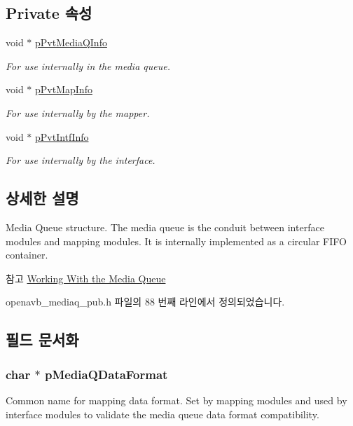 \subsection*{Private 속성}
\begin{DoxyCompactItemize}
\item 
void $\ast$ \hyperlink{structmedia__q__t_acb2a0999918038ea5c47311434ce7354}{p\+Pvt\+Media\+Q\+Info}
\begin{DoxyCompactList}\small\item\em For use internally in the media queue. \end{DoxyCompactList}\item 
void $\ast$ \hyperlink{structmedia__q__t_aee939b53d02a9217a5307ada087f3c50}{p\+Pvt\+Map\+Info}
\begin{DoxyCompactList}\small\item\em For use internally by the mapper. \end{DoxyCompactList}\item 
void $\ast$ \hyperlink{structmedia__q__t_a453af4755f0cf9b8fe035e62ecea845f}{p\+Pvt\+Intf\+Info}
\begin{DoxyCompactList}\small\item\em For use internally by the interface. \end{DoxyCompactList}\end{DoxyCompactItemize}


\subsection{상세한 설명}
Media Queue structure. The media queue is the conduit between interface modules and mapping modules. It is internally implemented as a circular F\+I\+FO container. \begin{DoxySeeAlso}{참고}
\hyperlink{sdk_avtp_interface_module_dev_working_with_mediaq}{Working With the Media Queue } 
\end{DoxySeeAlso}


openavb\+\_\+mediaq\+\_\+pub.\+h 파일의 88 번째 라인에서 정의되었습니다.



\subsection{필드 문서화}
\subsubsection[{\texorpdfstring{p\+Media\+Q\+Data\+Format}{pMediaQDataFormat}}]{\setlength{\rightskip}{0pt plus 5cm}char $\ast$ p\+Media\+Q\+Data\+Format}\hypertarget{structmedia__q__t_a3f16216bd90b1b04cca7fbb4766cb5ff}{}\label{structmedia__q__t_a3f16216bd90b1b04cca7fbb4766cb5ff}
Common name for mapping data format. Set by mapping modules and used by interface modules to validate the media queue data format compatibility. 

